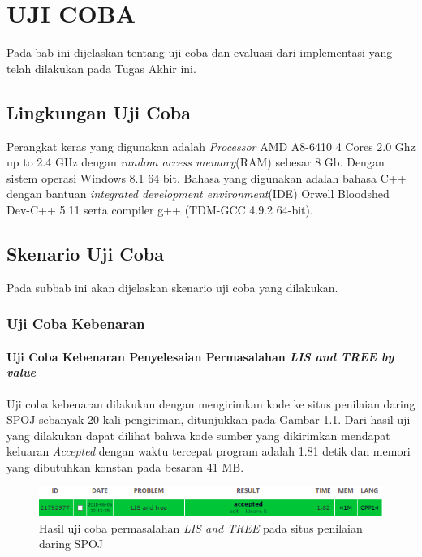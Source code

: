 \chapter{UJI COBA}

Pada bab ini dijelaskan tentang uji coba dan evaluasi dari implementasi yang telah dilakukan pada Tugas Akhir ini.

\section{\quad Lingkungan Uji Coba}
\quad Perangkat keras yang digunakan adalah \textit{Processor} AMD A8-6410 4 Cores 2.0 Ghz up to 2.4 GHz dengan \textit{random access memory}(RAM) sebesar 8 Gb. Dengan sistem operasi Windows 8.1 64 bit. Bahasa yang digunakan adalah bahasa C++ dengan bantuan \textit{integrated development environment}(IDE) Orwell Bloodshed Dev-C++ 5.11 serta compiler g++ (TDM-GCC 4.9.2 64-bit).
\section{\quad Skenario Uji Coba}
\quad Pada subbab ini akan dijelaskan skenario uji coba yang dilakukan.
	\subsection{\quad Uji Coba Kebenaran}
		
		\subsubsection{\quad Uji Coba Kebenaran Penyelesaian Permasalahan \textit{LIS and TREE by value}}
		\quad Uji coba kebenaran dilakukan dengan mengirimkan kode ke situs penilaian daring SPOJ sebanyak 20 kali pengiriman, ditunjukkan pada Gambar \ref{figure:accST}. Dari hasil uji yang dilakukan dapat dilihat bahwa kode sumber yang dikirimkan mendapat keluaran \textit{Accepted} dengan waktu tercepat program adalah 1.81 detik dan memori yang dibutuhkan konstan pada besaran 41 MB.
		\begin{figure}[H]
			\centerline{ \includegraphics[scale=0.39]{assets/images/valueacc.png}}
			\caption{Hasil uji coba permasalahan \textit{LIS and TREE} pada situs penilaian daring SPOJ}
			\label{figure:accST}
		\end{figure}
